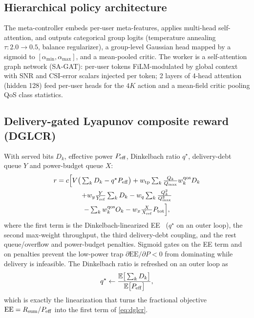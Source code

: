\documentclass[journal]{IEEEtran}
\begin{document}
\subsection{Hierarchical policy architecture}
The meta-controller embeds per-user meta-features, applies multi-head
self-attention, and outputs categorical group logits (temperature annealing
$\tau:2.0\to0.5$, balance regularizer), a group-level Gaussian head mapped by a
sigmoid to $[\alpha_{\min},\alpha_{\max}]$, and a mean-pooled critic. The worker
is a self-attention graph network (SA-GAT): per-user tokens FiLM-modulated by
global context with SNR and CSI-error scalars injected per token; 2 layers of
4-head attention (hidden 128) feed per-user heads for the $4K$ action and a
mean-field critic pooling QoS class statistics.

\subsection{Delivery-gated Lyapunov composite reward (DGLCR)}
With served bits $D_k$, effective power $P_{\rm eff}$, Dinkelbach ratio
$q^\star$, delivery-debt queue $Y$ and power-budget queue $X$:
\begin{multline}
r = c\Big[ V\big(\textstyle\sum_k D_k - q^\star P_{\rm eff}\big)
+ w_{\rm tp}\textstyle\sum_k \tfrac{Q_k}{Q_{\max}} w^{\rm qos}_k D_k\\
+ w_y \tfrac{Y}{Y_{\rm ref}} \textstyle\sum_k D_k
- w_q \textstyle\sum_k \tfrac{Q_k^2}{Q_{\max}^2}\\
- \textstyle\sum_k w^{\rm qos}_k O_k
- w_x \tfrac{X}{X_{\rm ref}} P_{\rm tot} \Big],
\label{eq:dglcr}
\end{multline}
where the first term is the Dinkelbach-linearized EE~\cite{dinkelbach1967}
($q^\star$ on an outer loop),
the second max-weight throughput, the third delivery-debt coupling, and the rest
queue/overflow and power-budget penalties. Sigmoid gates on the EE term and on
penalties prevent the low-power trap $\partial\mathrm{EE}/\partial P<0$ from
dominating while delivery is infeasible. The Dinkelbach ratio is refreshed on an
outer loop as
\begin{equation}
q^\star \leftarrow \frac{\mathbb{E}\big[\sum_k D_k\big]}{\mathbb{E}\big[P_{\rm eff}\big]},
\label{eq:dinkelbach}
\end{equation}
which is exactly the linearization that turns the fractional objective
$\mathrm{EE}=R_{\rm sum}/P_{\rm eff}$ into the first term of \eqref{eq:dglcr}.
\end{document}
